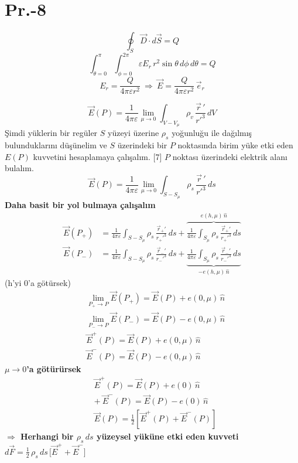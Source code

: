 \documentclass[11pt,a4paper]{article}
\begin{document}
\section{Pr.-8}
\[ \oint_S\vec D\cdot d\vec S=Q \]
\[ \int_{\theta=0}^{\pi}\int_{\phi=0}^{2\pi}\varepsilon E_r\,r^2\sin\theta\,d\phi\,d\theta=Q \]
\[ E_r=\frac{Q}{4\pi\varepsilon r^2}\ \Rightarrow\ \vec E=\frac{Q}{4\pi\varepsilon r^2}\,\vec e_r \]

\[ \vec E(P)=\frac{1}{4\pi\varepsilon}\lim_{\mu\to0}\int_{V-V_\mu}\rho_v\,\frac{\vec r\,'}{r'^3}\,dV \]
Şimdi yüklerin bir regüler $S$ yüzeyi üzerine $\rho_s$ yoğunluğu ile dağılmış bulunduklarını düşünelim ve $S$ üzerindeki bir $P$ noktasında birim yüke etki eden $E(P)$ kuvvetini hesaplamaya çalışalım.
[7]
$P$ noktası üzerindeki elektrik alanı bulalım.
\[ \vec E(P)=\frac{1}{4\pi\varepsilon}\lim_{\mu\to0}\int_{S-S_\mu}\rho_s\,\frac{\vec r\,'}{r'^3}\,ds \]
\textbf{Daha basit bir yol bulmaya çalışalım}
\begin{align*}
\vec E(P_+)&=\frac{1}{4\pi\varepsilon}\int_{S-S_\mu}\rho_s\,\frac{\vec r_+'}{r_+'^3}\,ds+\overbrace{\frac{1}{4\pi\varepsilon}\int_{S_\mu}\rho_s\,\frac{\vec r_+'}{r_+'^3}\,ds}^{e(h,\mu)\,\hat n}\\
\vec E(P_-)&=\frac{1}{4\pi\varepsilon}\int_{S-S_\mu}\rho_s\,\frac{\vec r_-'}{r_-'^3}\,ds+\underbrace{\frac{1}{4\pi\varepsilon}\int_{S_\mu}\rho_s\,\frac{\vec r_-'}{r_-'^3}\,ds}_{-e(h,\mu)\,\hat n}
\end{align*}
(h'yi 0'a götürsek)
\begin{align*}
&\lim_{P_+\to P}\vec E(P_+)=\vec E(P)+e(0,\mu)\,\hat n\\
&\lim_{P_-\to P}\vec E(P_-)=\vec E(P)-e(0,\mu)\,\hat n\\
&\vec E^{+}(P)=\vec E(P)+e(0,\mu)\,\hat n\\
&\vec E^{-}(P)=\vec E(P)-e(0,\mu)\,\hat n
\end{align*}
\textbf{$\mu\to0$'a götürürsek}
\begin{align*}
&\vec E^{+}(P)=\vec E(P)+e(0)\,\hat n\\
&+\ \vec E^{-}(P)=\vec E(P)-e(0)\,\hat n\\
&\vec E(P)=\tfrac12\left[\vec E^{+}(P)+\vec E^{-}(P)\right]
\end{align*}
\textbf{$\Rightarrow$ Herhangi bir $\rho_s\,ds$ yüzeysel yüküne etki eden kuvveti} $d\vec F=\frac12\,\rho_s\,ds\,\bigl[\vec E^{+}+\vec E^{-}\bigr]$
\end{document}
